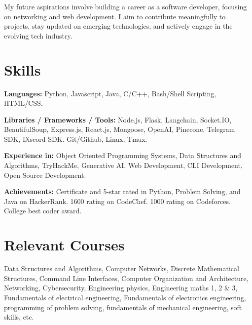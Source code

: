 \documentclass[11pt]{article}
\begin{document}
{{{\begin{itemize}[leftmargin=0.15in, label={}]
{{    My future aspirations involve building a career as a software developer, focusing on networking and web development. I aim to contribute meaningfully to projects, stay updated on emerging technologies, and actively engage in the evolving tech industry.
    }}\\
 \end{itemize}


\section{Skills}
\begin{description}
        \item \textbf{Languages:} \newline
        Python, Javascript, Java, C/C++, Bash/Shell Scripting, HTML/CSS.
        \item \textbf{Libraries / Frameworks / Tools:} \newline
        Node.js, Flask, Langchain, Socket.IO, BeautifulSoup, Express.js, React.js, Mongoose, OpenAI, Pinecone, Telegram SDK, Discord SDK. Git/Github, Linux, Tmux.
        \item \textbf{Experience in:} \newline
        Object Oriented Programming Systems, Data Structures and Algorithms, TryHackMe, Generative AI, Web Development, CLI Development, Open Source Development.
        \item \textbf{Achievements:} \newline
        Certificate and 5-star rated in Python, Problem Solving, and Java on HackerRank. 1600 rating on CodeChef. 1000 rating on Codeforces. College best coder award.
\end{description}


\section{Relevant Courses}
\begin{itemize}[leftmargin=0.15in, label={}]
    \small{\item{
    Data Structures and Algorithms, Computer Networks, Discrete Mathematical Structures, Command Line Interfaces, Computer Organization and Architecture, Networking, Cybersecurity, Engineering physics, Engineering maths 1, 2 & 3, Fundamentals of electrical engineering, Fundamentals of electronics engineering, programming of problem solving, fundamentals of mechanical engineering, soft skills, etc.
    }}\\
 \end{itemize}


}}}
\end{document}
